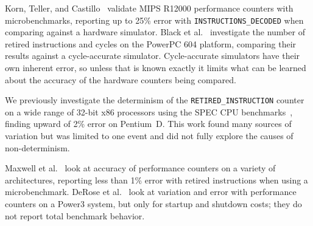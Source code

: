 Korn, Teller, and Castillo~\cite{korn+:ipcc01} validate
MIPS R12000 performance counters with  microbenchmarks,
reporting up to 25\% error with {\tt INSTRUCTIONS\_DECODED} 
when comparing against a hardware simulator.
Black et al.~\cite{black+:iccd96} investigate the number
of retired instructions and cycles on the PowerPC 604 platform,
comparing their results against a cycle-accurate simulator. 
Cycle-accurate simulators have their own inherent error, so unless that
is known exactly it limits what can be learned about the accuracy
of the hardware counters being compared.

We previously
investigate the determinism
of the {\tt RETIRED\_INSTRUCTION}
counter on a wide range of 32-bit x86 processors
using the SPEC CPU benchmarks~\cite{weaver+:iiswc08}, 
finding upward of 2\% error on 
Pentium~D.  This work found many sources of variation but
was limited to one event and did not fully explore the causes
of non-determinism.

Maxwell et al.~\cite{maxwell+:lacsi02} look at accuracy of performance
counters on a variety of architectures, reporting less than 1\% error with 
retired instructions when using a microbenchmark.
DeRose et al.~\cite{derose+:europar01} look at variation and error with
performance counters on a Power3 system, but only for startup and shutdown
costs; they do not report total benchmark behavior.


